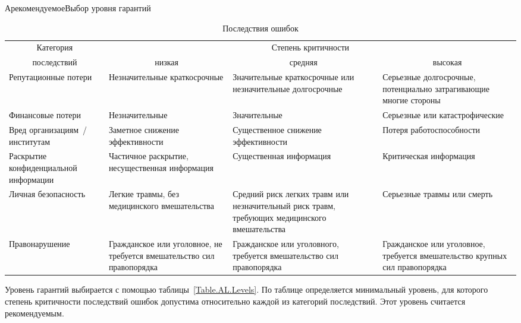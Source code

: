 \begin{appendix}{А}{рекомендуемое}{Выбор уровня гарантий}
\begin{table}[hbt]
\caption{Последствия ошибок}\label{Table.AL.Impact}
{\small
\begin{tabular}{|p{3.3cm}|p{4cm}|p{4cm}|p{4cm}|}
\hline
\multicolumn{1}{|c|}{Категория} & \multicolumn{3}{c|}{Степень критичности}\\
\cline{2-4}
\multicolumn{1}{|c|}{последствий} & \multicolumn{1}{c|}{низкая} 
& \multicolumn{1}{c|}{средняя} 
& \multicolumn{1}{c|}{высокая}\\
\hline
\hline
Репутационные потери & 
Незначительные краткосрочные & 
Значительные краткосрочные или незначительные долгосрочные &  
Серьезные долгосрочные, потенциально затрагивающие многие стороны\\
%
\hline
Финансовые потери & 
Незначительные &
Значительные &
Серьезные или катастрофические\\
%
\hline
Вред организациям~/ институтам & 
Заметное снижение эффективности & 
Существенное снижение эффективности & 
Потеря работоспособности\\ 
%
\hline
Раскрытие конфиденциальной информации &
Частичное раскрытие, несущественная информация &
Существенная информация &
Критическая информация\\
%
\hline
Личная безопасность &
Легкие травмы, без медицинского вмешательства &
Средний риск легких травм или незначительный риск травм, требующих 
медицинского вмешательства &
Серьезные травмы или смерть\\
%
\hline
Правонарушение & 
Гражданское или уголовное, не требуется вмешательство сил правопорядка &
Гражданское или уголовного, требуется вмешательство сил правопорядка &
Гражданское или уголовное, требуется вмешательство крупных сил правопорядка\\
\hline
\end{tabular}
}
\end{table}

\label{AL.Levels}

Уровень гарантий выбирается с помощью таблицы~\ref{Table.AL.Levels}.
%
По таблице определяется минимальный уровень, для которого степень критичности
последствий ошибок допустима относительно каждой из категорий последствий.
%
Этот уровень считается рекомендуемым. 


\end{appendix}
